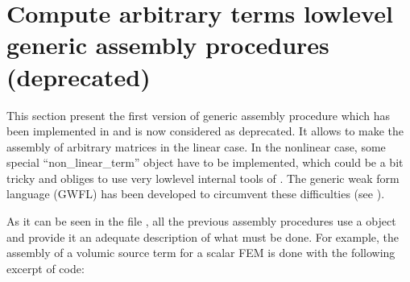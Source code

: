 \documentclass[a4paper,11pt,english]{sphinxmanual}
\begin{document}
\ignorespaces 

\chapter{Compute arbitrary terms \sphinxhyphen{} low\sphinxhyphen{}level generic assembly procedures (deprecated)}
\label{\detokenize{userdoc/gasm_low:compute-arbitrary-terms-low-level-generic-assembly-procedures-deprecated}}\label{\detokenize{userdoc/gasm_low:ud-gasm-low}}\label{\detokenize{userdoc/gasm_low:index-0}}\label{\detokenize{userdoc/gasm_low::doc}}
This section present the first version of generic assembly procedure which has been implemented in  and is now considered as deprecated. It allows to make the assembly of arbitrary matrices in the linear case. In the nonlinear case, some special “non\_linear\_term” object have to be implemented, which could be a bit tricky and obliges to use very low\sphinxhyphen{}level internal tools of . The generic weak form language (GWFL) has been developed to circumvent these difficulties (see {\hyperref[\detokenize{userdoc/gasm_high:ud-gasm-high}]{}}).

As it can be seen in the file , all the
previous assembly procedures use a  object and provide it an adequate
description of what must be done. For example, the assembly of a volumic source
term for a scalar FEM is done with the following excerpt of code:

\begin{sphinxVerbatim}[commandchars=\\\{\}]
 
\end{sphinxVerbatim}
\end{document}
